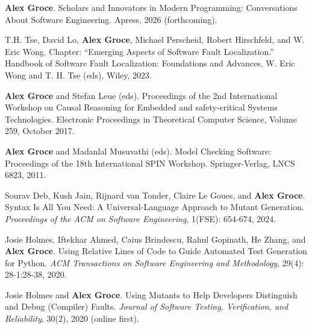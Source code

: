 \documentclass[ComputerScience]{vita}
\begin{document}
\begin{vita}
\begin{Books, Chapters, Edited Volumes}

\item {\bf Alex Groce}.
  \newblock Scholars and Innovators in Modern Programming: Conversations About Software Engineering.
  \newblock Apress, 2026 (forthcoming).
  
\item
T.H. Tse, David Lo, {\bf Alex Groce}, Michael Perscheid, Robert Hirschfeld,
and W. Eric Wong.
\newblock Chapter: ``Emerging Aspects of Software Fault Localization.''
\newblock Handbook of Software Fault Localization: Foundations and Advances, W. Eric Wong and T. H. Tse (eds), Wiley, 2023.
  
\item
{\bf Alex Groce} and Stefan Leue (eds).
\newblock Proceedings of the 2nd International Workshop on 
Causal Reasoning for Embedded and safety-critical Systems Technologies.
\newblock Electronic Proceedings in Theoretical Computer Science, Volume 259, October 2017.

\item
{\bf Alex Groce} and Madanlal Musuvathi (eds).
\newblock Model Checking Software: Proceedings of the 18th International SPIN Workshop.
\newblock Springer-Verlag, LNCS 6823, 2011. 

\end{Books, Chapters, Edited Volumes}

\begin{Refereed Journal Publications}
\item Sourav Deb, Kush Jain, Rijnard van Tonder, Claire Le Goues, and
  {\bf Alex Groce}.
 \newblock  Syntax Is All You Need: A Universal-Language Approach to
 Mutant Generation.
  \newblock \emph{Proceedings of the ACM on Software Engineering},
  1(FSE): 654-674, 2024.
  
\item
Josie Holmes, Iftekhar Ahmed, Caius Brindescu, Rahul Gopinath, He
Zhang, and {\bf Alex Groce}.
\newblock Using Relative Lines of Code to Guide Automated Test
Generation for Python.
\newblock \emph{ACM Transactions on Software Engineering and
  Methodology}, 29(4): 28-1:28-38, 2020.
  
\item
Josie Holmes and {\bf Alex Groce}.
\newblock Using Mutants to Help Developers Distinguish and Debug (Compiler) Faults.
\newblock \emph{Journal of Software Testing, Verification, and
  Reliability}, 30(2), 2020 (online first).


\end{Refereed Journal Publications}
\end{vita}
\end{document}
